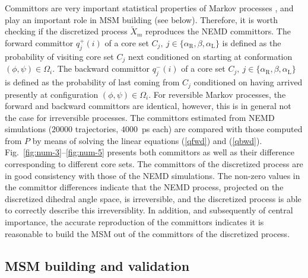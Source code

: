 \documentclass[aps, pre, preprint,unsortedaddress,a4paper,onecolumn,showkeys]{revtex4}
\newcommand{\fwd}[0]{+}
\newcommand{\bwd}[0]{-}
\newcommand{\confaa}[0]{{\alpha_{\textrm{R}}}}
\newcommand{\confc}[0]{{\alpha_{\textrm{L}}}}
\begin{document}
Committors are very important statistical properties of Markov processes \cite{PrinzHeldSmithNoe_Committorprep,PNAS09}, and play
an important role in MSM building \cite{A19-31,A19-29,djurdjevac2010markov} (see below). Therefore, it is worth
checking if the discretized process $\tilde X_m$ reproduces the NEMD committors.
The forward committor $q^\fwd_j(i)$ of a core set $C_j,\
j\in\{\confaa, \beta, \confc\}$ is defined as the probability of
visiting core set $C_j$ next conditioned on starting at conformation
$(\phi,\psi)\in\Omega_i$.  The backward committor $q^\bwd_j(i)$ of a
core set $C_j,\ j\in\{\confaa, \beta, \confc\}$ is defined as the
probability of last coming from $C_j$ conditioned on having arrived presently at
configuration $(\phi,\psi)\in\Omega_i$.
For reversible Markov processes, the
forward and backward committors are identical, however, this is in
general not the case for irreversible processes.
The committors estimated from NEMD simulations ($20000$ trajectories, $4000$~ps each) are compared with
those computed from $P$ by means of solving the linear equations (\ref{qfwd}) and (\ref{qbwd}).
Fig.~\ref{fig:num-3}--\ref{fig:num-5} presents both
committors as well as their difference corresponding to different core sets.
The committors of the discretized process are in good consistency with those of
the NEMD simulations. The non-zero values in the committor differences
indicate that the NEMD process, projected on the discretized
dihedral angle space, is irreversible, and
the discretized process is able to correctly describe this irreversiblity.
In addition, and subsequently of central importance, the accurate reproduction of the committors indicates it is reasonable to build the 
MSM out of the committors of the  discretized process.



\subsection{MSM building and validation}
\end{document}
